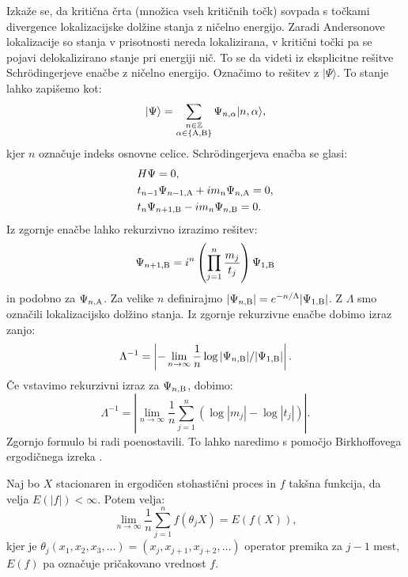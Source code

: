 Izkaže se, da kritična črta (množica vseh kritičnih točk) sovpada s točkami divergence lokalizacijske dolžine stanja z ničelno energijo. Zaradi Andersonove lokalizacije so stanja v prisotnosti nereda lokalizirana, v kritični točki pa se pojavi delokalizirano stanje pri energiji nič.
To se da videti iz eksplicitne rešitve Schrödingerjeve enačbe z ničelno energijo. Označimo to rešitev z $|  \Psi \rangle$.
To stanje lahko zapišemo kot:
\begin{equation}
| \Psi \rangle = \sum_{\substack{n \in \mathbb{Z} \\ \alpha \in \{ \textup{A,B}\}}} \Psi_{n, \alpha} |n, \alpha \rangle,
\end{equation}
kjer $n$ označuje indeks osnovne celice.
Schrödingerjeva enačba se glasi:
\begin{align}
&H \Psi = 0, \\
& t_{n-1} \Psi_{n-1,\textup{A}} + i m_n \Psi_{n,\textup{A}} = 0,\\
&t_n \Psi_{n+1, \textup{B}} -  i m_n \Psi_{n, \textup{B}} = 0.
\end{align}
Iz zgornje enačbe lahko rekurzivno izrazimo rešitev:
\begin{equation}
\Psi_{n+1, \textup{B}} = i^n \left( \prod_{j=1}^n \frac{m_j}{t_j} \right) \Psi_{1,\textup{B}}
\end{equation}
in podobno za $\Psi_{n,\textup{A}}$.
Za velike $n$ definirajmo $|\Psi_{n, \textup{B}}| = e^{-n/\Lambda } |\Psi_{1, \textup{B}}|$. Z $\Lambda$ smo označili lokalizacijsko dolžino stanja.
Iz zgornje rekurzivne enačbe dobimo izraz zanjo:
\begin{equation}
\Lambda^{-1} = \left| - \lim_{n \to \infty} \frac{1}{n} \log |\Psi_{n, \textup{B}}| / |\Psi_{1, \textup{B}}| \right|.
\end{equation}
Če vstavimo rekurzivni izraz za $\Psi_{n, \textup{B}}$, dobimo:
\begin{equation} \label{empiricnalok}
\Lambda^{-1} = \left| \lim_{n \to \infty} \frac{1}{n} \sum_{j=1}^n ( \log |m_j| - \log |t_j| ) \right|.
\end{equation}
Zgornjo formulo bi radi poenostavili. 
To lahko naredimo s pomočjo Birkhoffovega ergodičnega izreka \cite{birkhoff}.
\begin{theorem*}
Naj bo $X$ stacionaren in ergodičen stohastični proces in $f$ takšna funkcija, da velja $E(|f|) < \infty$. Potem velja:
\begin{equation}
\lim_{n \to \infty} \frac{1}{n} \sum_{j=1}^{n} f(\theta_j X) = E(f(X)),
\end{equation}
kjer je $\theta_j (x_1,x_2,x_3, \dots) = (x_j,x_{j+1},x_{j+2}, \dots)$ operator premika za $j-1$ mest, $E(f)$ pa označuje pričakovano vrednost $f$.
\end{theorem*}
